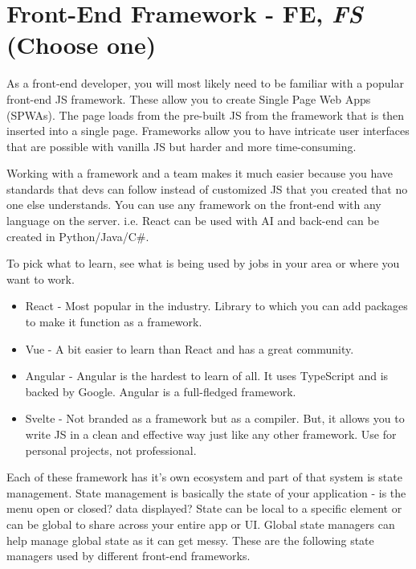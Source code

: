 \section{Front-End Framework - FE, \emph{FS} \small{(Choose one)}}
As a front-end developer, you will most likely need to be familiar with a popular front-end JS framework. These allow you to create Single Page Web Apps (SPWAs). The page loads from the pre-built JS from the framework that is then inserted into a single page. Frameworks allow you to have intricate user interfaces that are possible with vanilla JS but harder and more time-consuming. 

Working with a framework and a team makes it much easier because you have standards that devs can follow instead of customized JS that you created that no one else understands. You can use any framework on the front-end with any language on the server. i.e. React can be used with AI and back-end can be created in Python/Java/C\#.

To pick what to learn, see what is being used by jobs in your area or where you want to work.

\begin{itemize}
    \item React - Most popular in the industry. Library to which you can add packages to make it function as a framework. 
    \item Vue - A bit easier to learn than React and has a great community. 
    \item Angular - Angular is the hardest to learn of all. It uses TypeScript and is backed by Google. Angular is a full-fledged framework.
    \item Svelte - Not branded as a framework but as a compiler. But, it allows you to write JS in a clean and effective way just like any other framework. Use for personal projects, not professional.
\end{itemize}

Each of these framework has it's own ecosystem and part of that system is state management. State management is basically the state of your application - is the menu open or closed? data displayed? State can be local to a specific element or can be global to share across your entire app or UI. Global state managers can help manage global state as it can get messy. These are the following state managers used by different front-end frameworks. 

